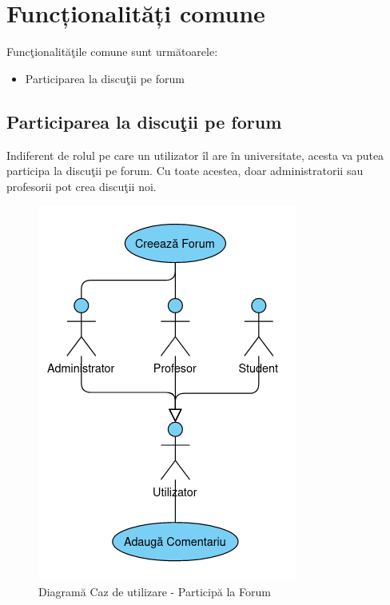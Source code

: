 \documentclass[12pt, a4paper, oneside, romanian]{teza-upb}
\begin{document}
\section{Funcționalități comune}

Funcţionalităţile comune sunt următoarele:
\begin{itemize}
	\item Participarea la discuţii pe forum
\end{itemize}

\subsection{Participarea la discuţii pe forum}

Indiferent de rolul pe care un utilizator îl are în universitate, acesta va putea participa la discuţii pe forum. Cu toate acestea, doar administratorii sau profesorii pot crea discuţii noi.

\begin{figure}[H]
\centering
\includegraphics*[width=0.45\columnwidth]{diagrama-use-case-participa-la-forum}
\caption{Diagramă Caz de utilizare - Participă la Forum}
\label{diagrama-use-case-participa-la-forum}
\end{figure}
\end{document}
